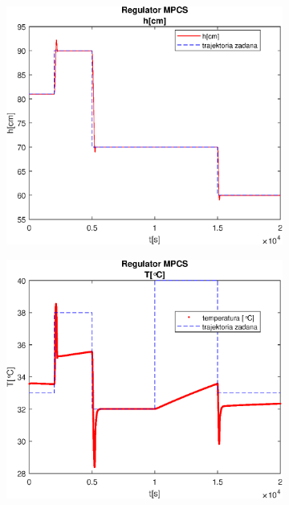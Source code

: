 \begin{figure}[h!]
   \centering
   \begin{subfigure}[b]{0.4\textwidth}
      \includegraphics[width=1\linewidth]{img/MPCSanaLin/MPCSLinHN50Nu10l100.eps}
      \caption{}
      \label{fig:fig:MPCSLinN50Nu10l1001}
   \end{subfigure}
       
   \begin{subfigure}[b]{0.4\textwidth}
      \includegraphics[width=1\linewidth]{img/MPCSanaLin/MPCSLinTN50Nu10l100.eps}
      \caption{}
      \label{fig:fig:MPCSLinN50Nu10l1002}
   \end{subfigure}
       

\end{figure}
